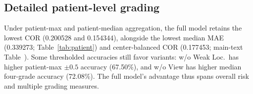 \subsection{Detailed patient-level grading}\label{sec:appendix-patient}
Under patient-max and patient-median aggregation, the full model retains the lowest COR (0.200528 and 0.154344), alongside the lowest median MAE (0.339273; Table~\ref{tab:patient}) and center-balanced COR (0.177453; main-text Table~). Some thresholded accuracies still favor variants: w/o Weak Loc.\ has higher patient-max $\pm0.5$ accuracy (67.50\%), and w/o View has higher median four-grade accuracy (72.08\%). The full model's advantage thus spans overall risk and multiple grading measures.
